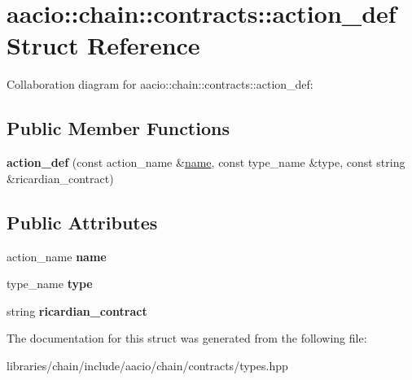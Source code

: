 \hypertarget{structaacio_1_1chain_1_1contracts_1_1action__def}{}\section{aacio\+:\+:chain\+:\+:contracts\+:\+:action\+\_\+def Struct Reference}
\label{structaacio_1_1chain_1_1contracts_1_1action__def}


Collaboration diagram for aacio\+:\+:chain\+:\+:contracts\+:\+:action\+\_\+def\+:
\subsection*{Public Member Functions}
\begin{DoxyCompactItemize}
\item 
\mbox{\label{structaacio_1_1chain_1_1contracts_1_1action__def_aa3417ed54a014210492e28b432a04991}} 
{\bfseries action\+\_\+def} (const action\+\_\+name \&\mbox{\hyperlink{structaacio_1_1chain_1_1name}{name}}, const type\+\_\+name \&type, const string \&ricardian\+\_\+contract)
\end{DoxyCompactItemize}
\subsection*{Public Attributes}
\begin{DoxyCompactItemize}
\item 
\mbox{\label{structaacio_1_1chain_1_1contracts_1_1action__def_a05885f670b5ee1347cdb325b9bc409cb}} 
action\+\_\+name {\bfseries name}
\item 
\mbox{\label{structaacio_1_1chain_1_1contracts_1_1action__def_a7430012bd402ebe2f926dc35c0d753a7}} 
type\+\_\+name {\bfseries type}
\item 
\mbox{\label{structaacio_1_1chain_1_1contracts_1_1action__def_a8a32ce585bd396fa78a01a586b207ab2}} 
string {\bfseries ricardian\+\_\+contract}
\end{DoxyCompactItemize}


The documentation for this struct was generated from the following file\+:\begin{DoxyCompactItemize}
\item 
libraries/chain/include/aacio/chain/contracts/types.\+hpp\end{DoxyCompactItemize}
